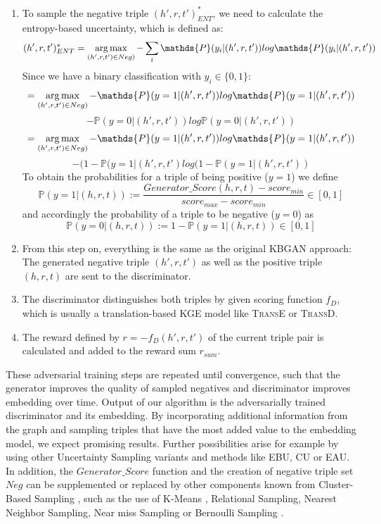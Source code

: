 \begin{enumerate}
    \item 
    To sample the negative triple $(h',r,t')^{*}_{ENT}$, we need to calculate the entropy-based uncertainty, which is defined as:
    $$(h',r,t')^{*}_{ENT} = \argmax_{(h',r,t') \in Neg)} - \sum_{i}{\mathds{P}(y_i | (h',r,t')) log \mathds{P}(y_i|(h',r,t'))}$$
    Since we have a binary classification with $y_i \in \{0,1\}$:\\
    $$= \argmax_{(h',r,t') \in Neg)} - \mathds{P}(y = 1| (h',r,t')) log \mathds{P}(y = 1|(h',r,t'))$$
    $$- \mathds{P}(y = 0| (h',r,t')) log \mathds{P}(y = 0|(h',r,t'))$$
    $$= \argmax_{(h',r,t') \in Neg)} - \mathds{P}(y = 1| (h',r,t')) log \mathds{P}(y = 1|(h',r,t'))$$
    $$- (1 - \mathds{P}(y = 1|(h',r,t') log(1 - \mathds{P}(y = 1|(h',r,t'))$$
    To obtain the probabilities for a triple of being positive ($y=1$) we define
    \begin{equation}
        \mathds{P}(y = 1|(h, r, t)) := \frac{Generator\_Score(h, r, t) - score_{min}}{score_{max} - score_{min}} \in [0, 1]
    \end{equation}
    and accordingly the probability of a triple to be negative ($y=0$) as
    \begin{equation}
        \mathds{P}(y = 0|(h, r, t)) := 1 - \mathds{P}(y = 1|(h, r, t)) \in [0,1]
    \end{equation}
    
    \item 
    From this step on, everything is the same as the original \ac{KBGAN} approach:
    The generated negative triple $(h',r,t')$ as well as the positive triple $(h, r, t)$ are sent to the discriminator.
    
    \item 
    The discriminator distinguishes both triples by given scoring function $f_D$, which is usually a translation-based \ac{KGE} model like \textsc{TransE} or \textsc{TransD}.
    
    \item 
    The reward defined by $r = - f_D(h',r,t')$ of the current triple pair is calculated and added to the reward sum $r_{sum}$.
    
\end{enumerate}
These adversarial training steps are repeated until convergence, such that the generator improves the quality of sampled negatives and discriminator improves embedding over time.
Output of our algorithm is the adversarially trained discriminator and its embedding.
By incorporating additional information from the graph and sampling triples that have the most added value to the embedding model, we expect promising results.
Further possibilities arise for example by using other Uncertainty Sampling variants and methods like \ac{EBU}, \ac{CU} or \ac{EAU}.
In addition, the $Generator\_Score$ function and the creation of negative triple set $Neg$ can be supplemented or replaced by other components known from Cluster-Based Sampling , such as the use of K-Means \cite{qianunderstanding}, Relational Sampling, Nearest Neighbor Sampling, Near miss Sampling \cite{kotnis2017analysis} or Bernoulli Sampling \cite{qianunderstanding}.


